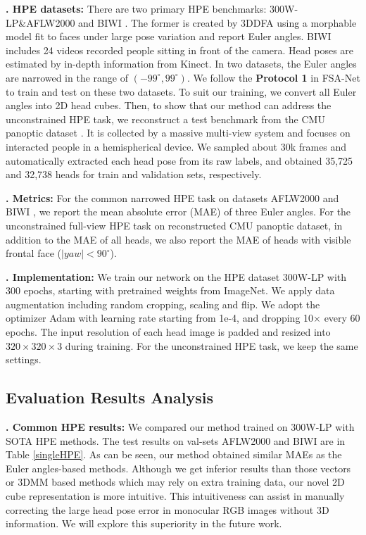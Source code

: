 \documentclass{article}
\begin{document}
{\bf {}. HPE datasets:}
There are two primary HPE benchmarks: 300W-LP\&AFLW2000 \cite{zhu2016face} and BIWI \cite{fanelli2013random}. The former is created by 3DDFA \cite{zhu2016face} using a morphable model fit to faces under large pose variation and report Euler angles. BIWI includes 24 videos recorded people sitting in front of the camera. Head poses are estimated by in-depth information from Kinect. In two datasets, the Euler angles are narrowed in the range of $(-99^{\circ}, 99^{\circ})$. We follow the {\bf Protocol 1} in FSA-Net \cite{yang2019fsa} to train and test on these two datasets. To suit our training, we convert all Euler angles into 2D head cubes. Then, to show that our method can address the unconstrained HPE task, we reconstruct a test benchmark from the CMU panoptic dataset \cite{joo2015panoptic}. It is collected by a massive multi-view system and focuses on interacted people in a hemispherical device. We sampled about 30k frames and automatically extracted each head pose from its raw labels, and obtained 35,725 and 32,738 heads for train and validation sets, respectively.

{\bf {}. Metrics:}
For the common narrowed HPE task on datasets AFLW2000 \cite{zhu2016face} and BIWI \cite{fanelli2013random}, we report the mean absolute error (MAE) of three Euler angles. For the unconstrained full-view HPE task on reconstructed CMU panoptic dataset, in addition to the MAE of all heads, we also report the MAE of heads with visible frontal face ($|yaw|<90^{\circ}$). 

{\bf {}. Implementation:}
We train our network on the HPE dataset 300W-LP with 300 epochs, starting with pretrained weights from ImageNet. We apply data augmentation including random cropping, scaling and flip. We adopt the optimizer Adam with learning rate starting from 1e-4, and dropping 10$\times$ every 60 epochs. The input resolution of each head image is padded and resized into $320 \times 320 \times 3$ during training. For the unconstrained HPE task, we keep the same settings.


\subsection{Evaluation Results Analysis}

{\bf {}. Common HPE results:}
We compared our method trained on 300W-LP with SOTA HPE methods. The test results on val-sets AFLW2000 and BIWI are in Table \ref{singleHPE}. As can be seen, our method obtained similar MAEs as the Euler angles-based methods. Although we get inferior results than those vectors or 3DMM based methods which may rely on extra training data, our novel 2D cube representation is more intuitive. This intuitiveness can assist in manually correcting the large head pose error in monocular RGB images without 3D information. We will explore this superiority in the future work.
\end{document}
